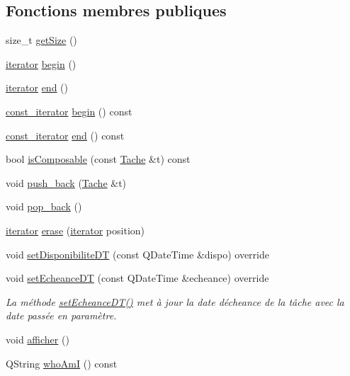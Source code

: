 \subsection*{Fonctions membres publiques}
\begin{DoxyCompactItemize}
\item 
size\+\_\+t \hyperlink{class_tache_composite_af1ba658a78e4e6f1080b9c000eba4201}{get\+Size} ()
\item 
\hyperlink{class_tache_composite_1_1iterator}{iterator} \hyperlink{class_tache_composite_a0ddf3aa66c03324530c1edae9e51d97b}{begin} ()
\item 
\hyperlink{class_tache_composite_1_1iterator}{iterator} \hyperlink{class_tache_composite_a19085d7f01e368efab4ec40f63a04117}{end} ()
\item 
\hyperlink{class_tache_composite_1_1const__iterator}{const\+\_\+iterator} \hyperlink{class_tache_composite_a08938304455ed31cc3219677787d376e}{begin} () const 
\item 
\hyperlink{class_tache_composite_1_1const__iterator}{const\+\_\+iterator} \hyperlink{class_tache_composite_adc3b95cd5e0da1d570535356a7e18ecb}{end} () const 
\item 
bool \hyperlink{class_tache_composite_afbbffa746a783c2f5475bd2746bdc318}{is\+Composable} (const \hyperlink{class_tache}{Tache} \&t) const 
\item 
void \hyperlink{class_tache_composite_a560d35db6e3c5c0961fcc7224f65765d}{push\+\_\+back} (\hyperlink{class_tache}{Tache} \&t)
\item 
void \hyperlink{class_tache_composite_a8f6db68650bf23621041520216dd1a2a}{pop\+\_\+back} ()
\item 
\hyperlink{class_tache_composite_1_1iterator}{iterator} \hyperlink{class_tache_composite_af456d1818e34d4e7a91c624a28de2f78}{erase} (\hyperlink{class_tache_composite_1_1iterator}{iterator} position)
\item 
void \hyperlink{class_tache_composite_a5032eaa67db81045f77dbf5446943261}{set\+Disponibilite\+D\+T} (const Q\+Date\+Time \&dispo) override
\item 
void \hyperlink{class_tache_composite_a286829ee84d887a7416318a07fb72a2e}{set\+Echeance\+D\+T} (const Q\+Date\+Time \&echeance) override
\begin{DoxyCompactList}\small\item\em La méthode \hyperlink{class_tache_composite_a286829ee84d887a7416318a07fb72a2e}{set\+Echeance\+D\+T()} met à jour la date d\textquotesingle{}écheance de la tâche avec la date passée en paramètre. \end{DoxyCompactList}\item 
void \hyperlink{class_tache_composite_a784957f6b9a7b7ccb0105e8e73104567}{afficher} ()
\item 
Q\+String \hyperlink{class_tache_composite_ac49737e53296e809078d099de5525973}{who\+Am\+I} () const 
\end{DoxyCompactItemize}
